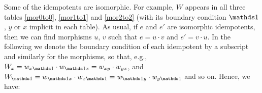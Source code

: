 \begin{table}
{{
}
}
\caption{Minimal idempotents for $\tube_{x \to x}$. 
We have used the notation $t_x =t_{x\unit xx; 11}$, $v_x = \text{id}_x \in \tube_{x \to x}$, $X_{ij} = t_{xxx; ij}$, $v_x l_y = t_{xxxy; 11}$, and $t_x h_y = t_{xyxx; 11}$. 
Where $\alpha = \frac{1}{2} \left( 1+ 1/\sqrt{2d+1} \right)$, and $\beta = \frac{1}{2} \left( 1- 1/\sqrt{2d+1} \right)$, $\gamma/\alpha =1/(2\sqrt{d} 3^{1/4})$, and $d = 1+ \sqrt{3} $. 
\label{mor1to1}}
\end{table}


Some of the idempotents are isomorphic. 
For example, $W$ appears in all three tables \ref{mor0to0}, \ref{mor1to1} and \ref{mor2to2} (with its boundary condition $\unit$, $y$ or $x$ implicit in each table).
As usual, if $e$ and $e'$ are isomorphic idempotents, then we can find morphisms $u$, $v$ such that $e = u\cdot v$ and $e' = v \cdot u$.
In the following we denote the boundary condition of each idempotent by a subscript and similarly for the morphisms, so that, e.g., $W_x = w_{x \unit} \cdot w_{\unit x} = w_{xy} \cdot w_{yx}$, and $W_{\unit} = w_{\unit x} \cdot w_{x \unit}  = w_{\unit y}\cdot w_{y \unit} $ and so on. 
Hence, we have:


